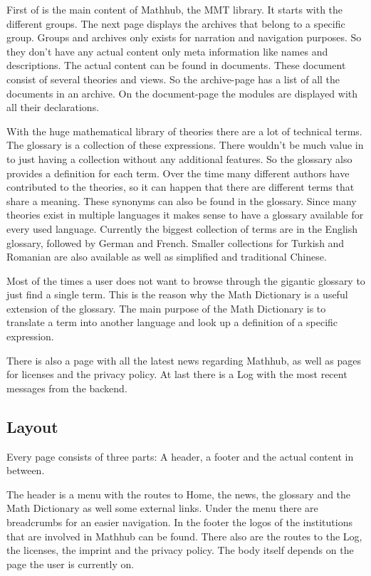 \documentclass[11pt,a4paper]{article}
\begin{document}
First of is the main content of Mathhub, the MMT library.
It starts with the different groups.
The next page displays the archives that belong to a specific group.
Groups and archives only exists for narration and navigation purposes.
So they don't have any actual content only meta information like names and descriptions.
The actual content can be found in documents.
These document consist of several theories and views.
So the archive-page has a list of all the documents in an archive.
On the document-page the modules are displayed with all their declarations.


With the huge mathematical library of theories there are a lot of technical terms.
The glossary is a collection of these expressions.
There wouldn't be much value in to just having a collection without any additional features.
So the glossary also provides a definition for each term.
Over the time many different authors have contributed to the theories, so it can happen that there are different terms that share a meaning.
These synonyms can also be found in the glossary.
Since many theories exist in multiple languages it makes sense to have a glossary available for every used language.
Currently the biggest collection of terms are in the English glossary, followed by German and French.
Smaller collections for Turkish and Romanian are also available as well as simplified and traditional Chinese.

Most of the times a user does not want to browse through the gigantic glossary to just find a single term.
This is the reason why the Math Dictionary is a useful extension of the glossary.
The main purpose of the Math Dictionary is to translate a term into another language and look up a definition of a specific expression.


There is also a page with all the latest news regarding Mathhub,  as well as pages for licenses and the privacy policy.
At last there is a Log with the most recent messages from the backend. 

\subsection{Layout}
Every page consists of three parts: A header, a footer and the actual content in between.

The header is a menu with the routes to Home, the news, the glossary and the Math Dictionary as well some external links.
Under the menu there are breadcrumbs for an easier navigation.
In the footer the logos of the institutions that are involved in Mathhub can be found.
There also are the routes to the Log, the licenses, the imprint and the privacy policy.
The body itself depends on the page the user is currently on.
\end{document}
